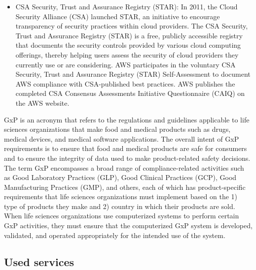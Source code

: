 \begin{itemize}
    \item CSA Security, Trust and Assurance Registry (STAR): In 2011, the Cloud Security Alliance (CSA) launched STAR, an initiative to encourage transparency of security practices within cloud providers. The CSA Security, Trust and Assurance Registry (STAR) is a free, publicly accessible registry that documents the security controls provided by various cloud computing offerings, thereby helping users assess the security of cloud providers they currently use or are considering. AWS participates in the voluntary CSA Security, Trust and Assurance Registry (STAR) Self-Assessment to document AWS compliance with CSA-published best practices. AWS publishes the completed CSA Consensus Assessments Initiative Questionnaire (CAIQ) on the AWS website.
\end{itemize}

GxP is an acronym that refers to the regulations and guidelines applicable to life sciences organizations that make food and medical products such as drugs, medical devices, and medical software applications. The overall intent of GxP requirements is to ensure that food and medical products are safe for consumers and to ensure the integrity of data used to make product-related safety decisions. The term GxP encompasses a broad range of compliance-related activities such as Good Laboratory Practices (GLP), Good Clinical Practices (GCP), Good Manufacturing Practices (GMP), and others, each of which has product-specific requirements that life sciences organizations must implement based on the 1) type of products they make and 2) country in which their products are sold. When life sciences organizations use computerized systems to perform certain GxP activities, they must ensure that the computerized GxP system is developed, validated, and operated appropriately for the intended use of the system. \cite{GxPCompliance}

\subsection{Used services}
